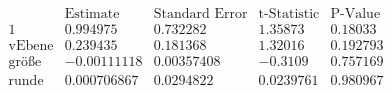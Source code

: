 \[\begin{array}{l|llll}
 \text{} & \text{Estimate} & \text{Standard Error} & \text{t-Statistic} & \text{P-Value} \\
\hline
 1 & 0.994975 & 0.732282 & 1.35873 & 0.18033 \\
 \text{vEbene} & 0.239435 & 0.181368 & 1.32016 & 0.192793 \\
 \text{gr{\" o}{\ss}e} & -0.00111118 & 0.00357408 & -0.3109 & 0.757169 \\
 \text{runde} & 0.000706867 & 0.0294822 & 0.0239761 & 0.980967 \\
\end{array}\]

